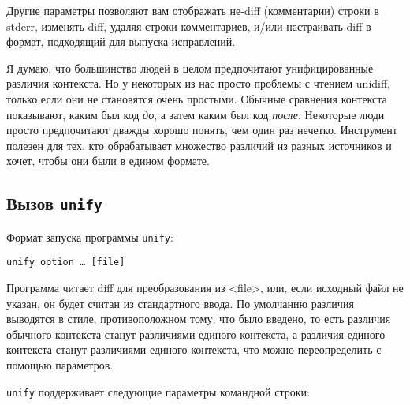 Другие параметры позволяют вам отображать не-diff (комментарии) строки в
stderr, изменять diff, удаляя строки комментариев, и/или настраивать
diff в формат, подходящий для выпуска исправлений.

Я думаю, что большинство людей в целом предпочитают унифицированные
различия контекста. Но у некоторых из нас просто проблемы с чтением
unidiff, только если они не становятся очень простыми. Обычные сравнения
контекста показывают, каким был код \emph{до}, а затем каким был код
\emph{после}. Некоторые люди просто предпочитают дважды хорошо понять,
чем один раз нечетко. Инструмент полезен для тех, кто обрабатывает
множество различий из разных источников и хочет, чтобы они были в едином
формате.

\hypertarget{_0412_044b_0437_043e_0432-unify}{%
\subsection{\texorpdfstring{Вызов
\texttt{unify}}{Вызов unify}}\label{_0412_044b_0437_043e_0432-unify}}

Формат запуска программы \texttt{unify}:

\begin{verbatim}
unify option … [file]
\end{verbatim}

Программа читает diff для преобразования из \textless file\textgreater,
или, если исходный файл не указан, он будет считан из стандартного
ввода. По умолчанию различия выводятся в стиле, противоположном тому,
что было введено, то есть различия обычного контекста станут различиями
единого контекста, а различия единого контекста станут различиями
единого контекста, что можно переопределить с помощью параметров.

\texttt{unify} поддерживает следующие параметры командной строки:

